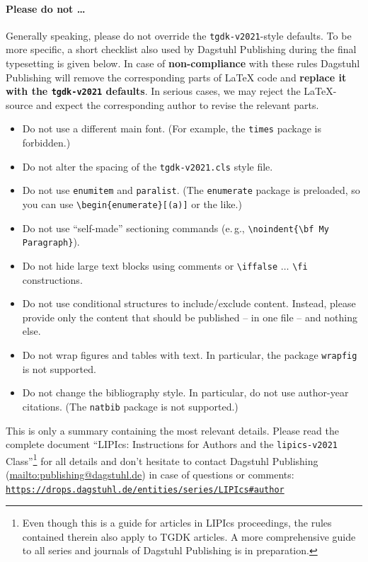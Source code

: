 \documentclass[a4paper,UKenglish,cleveref,autoref, thm-restate]{tgdk-v2021}
\begin{document}
\paragraph*{Please do not \ldots} %
Generally speaking, please do not override the \texttt{tgdk-v2021}-style defaults. To be more specific, a short checklist also used by Dagstuhl Publishing during the final typesetting is given below.
In case of \textbf{non-compliance} with these rules Dagstuhl Publishing will remove the corresponding parts of \LaTeX{} code and \textbf{replace it with the \texttt{tgdk-v2021} defaults}. In serious cases, we may reject the LaTeX-source and expect the corresponding author to revise the relevant parts.
\begin{itemize}
\item Do not use a different main font. (For example, the \texttt{times} package is forbidden.)
\item Do not alter the spacing of the \texttt{tgdk-v2021.cls} style file.
\item Do not use \verb+enumitem+ and \verb+paralist+. (The \texttt{enumerate} package is preloaded, so you can use
 \verb+\begin{enumerate}[(a)]+ or the like.)
\item Do not use ``self-made'' sectioning commands (e.\,g., \verb+\noindent{\bf My+ \verb+Paragraph}+).
\item Do not hide large text blocks using comments or \verb+\iffalse+ $\ldots$ \verb+\fi+ constructions. 
\item Do not use conditional structures to include/exclude content. Instead, please provide only the content that should be published -- in one file -- and nothing else.
\item Do not wrap figures and tables with text. In particular, the package \texttt{wrapfig} is not supported.
\item Do not change the bibliography style. In particular, do not use author-year citations. (The
\texttt{natbib} package is not supported.)
\end{itemize}

\enlargethispage{\baselineskip}

This is only a summary containing the most relevant details. Please read the complete document ``LIPIcs: Instructions for Authors and the \texttt{lipics-v2021} Class''\footnote{Even though this is a guide for articles in LIPIcs proceedings, the rules contained therein also apply to TGDK articles. A more comprehensive guide to all series and journals of Dagstuhl Publishing is in preparation.} for all details and don't hesitate to contact Dagstuhl Publishing (\url{mailto:publishing@dagstuhl.de}) in case of questions or comments:
\href{https://drops.dagstuhl.de/entities/series/LIPIcs#author}{\texttt{https://drops.dagstuhl.de/entities/series/LIPIcs\#author}}
\end{document}
